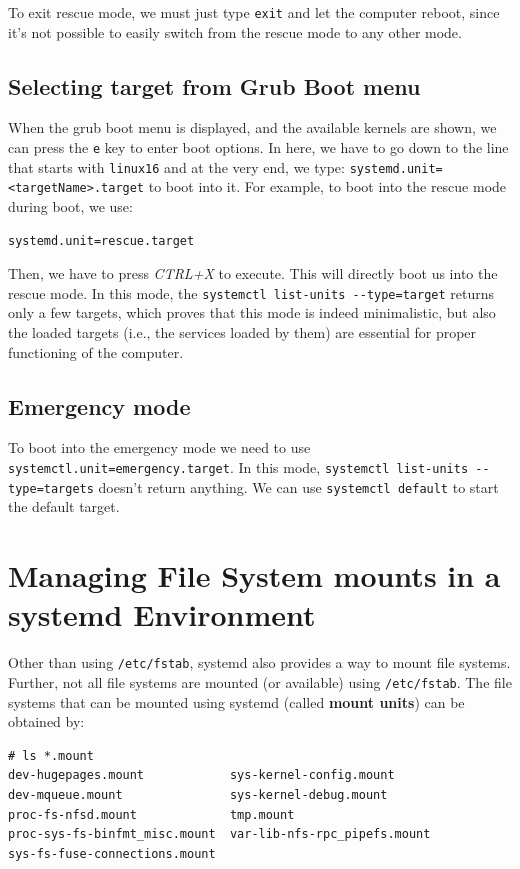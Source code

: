 \noindent
To exit rescue mode, we must just type \verb|exit| and let the computer reboot, since it's not possible to easily switch from the rescue mode to any other mode. 

\subsection{Selecting target from Grub Boot menu}
When the grub boot menu is displayed, and the available kernels are shown, we can press the \verb|e| key to enter boot options. In here, we have to go down to the line that starts with \verb|linux16| and at the very end, we type: \verb|systemd.unit=<targetName>.target| to boot into it. For example, to boot into the rescue mode during boot, we use:

\vspace{-15pt}
\begin{verbatim}
systemd.unit=rescue.target
\end{verbatim}
\vspace{-10pt}

\noindent
Then, we have to press \textit{CTRL+X} to execute. This will directly boot us into the rescue mode. In this mode, the \verb|systemctl list-units --type=target| returns only a few targets, which proves that this mode is indeed minimalistic, but also the loaded targets (i.e., the services loaded by them) are essential for proper functioning of the computer. 

\subsection{Emergency mode}
To boot into the emergency mode we need to use \verb|systemctl.unit=emergency.target|. In this mode, \verb|systemctl list-units --type=targets| doesn't return anything. We can use \verb|systemctl default| to start the default target. 

	\section{Managing File System mounts in a systemd Environment}
Other than using \verb|/etc/fstab|, systemd also provides a way to mount file systems. Further, not all file systems are mounted (or available) using \verb|/etc/fstab|. The file systems that can be mounted using systemd (called \textbf{mount units}) can be obtained by:

\vspace{-15pt}
\begin{verbatim}
# ls *.mount
dev-hugepages.mount            sys-kernel-config.mount
dev-mqueue.mount               sys-kernel-debug.mount
proc-fs-nfsd.mount             tmp.mount
proc-sys-fs-binfmt_misc.mount  var-lib-nfs-rpc_pipefs.mount
sys-fs-fuse-connections.mount
\end{verbatim}
\vspace{-10pt}

